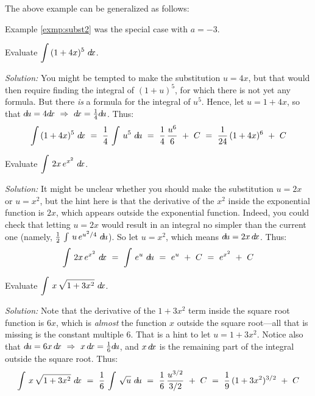 \noindent The above example can be generalized as follows:


\noindent Example \ref{exmp:subst2} was the special case with $a = -3$.

\begin{exmp}\label{exmp:subst3}
\noindent Evaluate $\displaystyle\int\,(1 + 4x)^5~d\!x$.\vspace{1mm}
\par\noindent\emph{Solution:} You might be tempted to make the substitution
$u = 4x$, but that would then require finding the integral of $(1+u)^5$, for
which there is not yet any formula. But there \emph{is} a formula for the
integral of $u^5$. Hence, let $u = 1 + 4x$, so that $d\!u = 4d\!x ~\Rightarrow~
d\!x = \frac{1}{4}d\!u$. Thus:
\[
\int\,(1 + 4x)^5~d\!x ~=~ \frac{1}{4}\,\int\,u^5~d\!u ~=~
\frac{1}{4}\,\frac{u^6}{6} ~+~ C ~=~ \frac{1}{24}\,(1 + 4x)^6 ~+~ C
\]
\end{exmp}
\begin{exmp}\label{exmp:subst4}
\noindent Evaluate $\displaystyle\int\,2x\,e^{x^2}~d\!x$.\vspace{1mm}
\par\noindent\emph{Solution:} It might be unclear whether you should make the
substitution $u = 2x$ or $u = x^2$, but the hint here is that the derivative of
the $x^2$ inside the exponential function is $2x$, which appears outside the
exponential function. Indeed, you could check that letting $u = 2x$ would result
in an integral no simpler than the current one (namely,
$\frac{1}{2}\,\int\,u\,e^{u^2/4}~d\!u$). So let $u = x^2$, which means
$d\!u = 2x\,d\!x$. Thus:
\[
\int\,2x\,e^{x^2}~d\!x ~=~ \int\,e^{u}~d\!u ~=~ e^u ~+~ C ~=~ e^{x^2} ~+~ C
\]
\end{exmp}
\begin{exmp}\label{exmp:subst5}
\noindent Evaluate $\displaystyle\int\,x\,\sqrt{1 + 3x^2}~d\!x$.\vspace{1mm}
\par\noindent\emph{Solution:} Note that the derivative of the $1+3x^2$ term
inside the square root function is $6x$, which is \emph{almost} the function
$x$ outside the square root---all that is missing is the constant multiple $6$.
That is a hint to let $u = 1+3x^2$. Notice also that
$d\!u = 6x\,d\!x ~\Rightarrow~ x\,d\!x = \frac{1}{6}d\!u$, and $x\,d\!x$ is the
remaining part of the integral outside the square root. Thus:
\[
\int\,x\,\sqrt{1 + 3x^2}~d\!x ~=~ \frac{1}{6}\,\int\,\sqrt{u}~d\!u ~=~
 \frac{1}{6}\,\frac{u^{3/2}}{3/2} ~+~ C ~=~ \frac{1}{9}\,(1+3x^2)^{3/2} ~+~ C
\]
\end{exmp}
